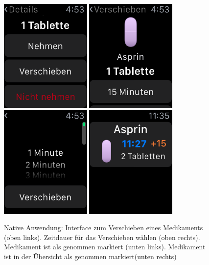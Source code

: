 \begin{figure}
	\caption{Native Anwendung: Interface zum Verschieben eines Medikaments (oben links). Zeitdauer für das Verschieben wählen (oben rechts). Medikament ist als genommen markiert (unten links). Medikament ist in der Übersicht als genommen markiert(unten rechts)}
	\label{fig:watch-app-delay}
	\centering
	\includegraphics[width=0.4\textwidth]{04_realisation/screenshots/watch/delay01.png}
	\includegraphics[width=0.4\textwidth]{04_realisation/screenshots/watch/delay02.png}
	\includegraphics[width=0.4\textwidth]{04_realisation/screenshots/watch/delay03.png}
	\includegraphics[width=0.4\textwidth]{04_realisation/screenshots/watch/delay04.png}
\end{figure}

